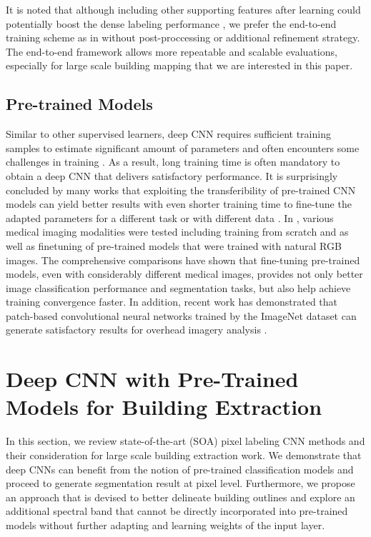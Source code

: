 \documentclass[journal]{IEEEtran}
\begin{document}
It is noted that although including other supporting features after learning could potentially boost the dense labeling performance \cite{PaisitkriangkraiSherrahJanneyEtAl2016}, we prefer the end-to-end training scheme as in \cite{Yuan2018,ShelhamerLongDarrell2017,Maggiori2016,VolpiTuia2017} without post-proccessing or additional refinement strategy. The end-to-end framework allows more repeatable and scalable evaluations, especially for large scale building mapping that we are interested in this paper.

\subsection{Pre-trained Models}
Similar to other supervised learners, deep CNN requires sufficient training samples to estimate significant amount of parameters and often encounters some challenges in training  \cite{ErhanManzagolBengioEtAl2009}. As a result, long training time is often mandatory to obtain a deep CNN that delivers satisfactory performance.  It is surprisingly concluded by many works that exploiting the transferibility of pre-trained CNN models can yield better results \cite{Penatti2015} with even shorter training time to fine-tune the adapted parameters for a different task or with different data \cite{Bittner2017481}. In \cite{TajbakhshShinGuruduEtAl2016,Gerrand2017}, various medical imaging modalities were tested including training from scratch and as well as finetuning of pre-trained models that were trained with natural RGB images. The comprehensive comparisons have shown that fine-tuning pre-trained models, even with considerably different medical images, provides not only better image classification performance and segmentation tasks, but also help achieve training convergence faster. In addition, recent work has demonstrated that patch-based convolutional neural networks trained by the ImageNet dataset can generate satisfactory results for overhead imagery analysis \cite{ChengMaZhouEtAl2016}. 


\section{Deep CNN with Pre-Trained Models for Building Extraction}
In this section, we review state-of-the-art (SOA) pixel labeling CNN methods and their consideration for large scale building extraction work. We demonstrate that deep CNNs can benefit from the notion of pre-trained classification models and proceed to generate segmentation result at pixel level. Furthermore, we propose an approach that is devised to better delineate building outlines and explore an additional spectral band that cannot be directly incorporated into pre-trained models without further adapting and learning weights of the input layer. 
\end{document}
